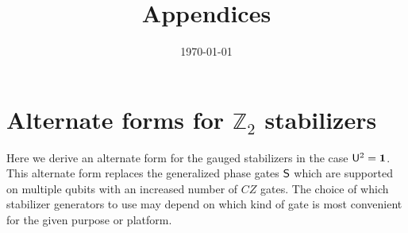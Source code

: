 \documentclass[11pt]{article}
\begin{document}
    \title{Appendices}
    \date{\today}
    \maketitle
    \appendix
\fi

\makeatletter
{}
\makeatother

\section{Alternate forms for $\mathbb{Z}_2$ stabilizers}

Here we derive an alternate form for the gauged stabilizers in the case $\mathsf{U}^2 = \mathbf{1}$. This alternate form replaces the generalized phase gates $\mathsf{S}$ which are supported on multiple qubits with an increased number of $CZ$ gates. The choice of which stabilizer generators to use may depend on which kind of gate is most convenient for the given purpose or platform.
\end{document}
